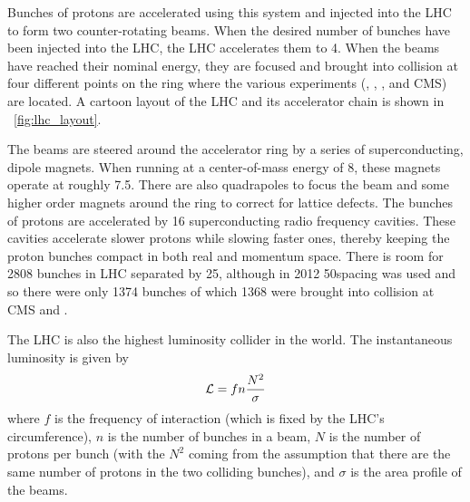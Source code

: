 Bunches of protons are accelerated using this system and injected into the LHC
to form two counter-rotating beams. When the desired number of bunches have
been injected into the LHC, the LHC accelerates them to 4\TeV. When the beams
have reached their nominal energy, they are focused and brought into collision
at four different points on the ring where the various experiments (\ALICE,
\ATLAS, \LHCB, and CMS) are located. A cartoon layout of the LHC and its
accelerator chain is shown in \FIG~\ref{fig:lhc_layout}.

The beams are steered around the accelerator ring by a series of
superconducting, dipole magnets. When running at a center-of-mass energy of
8\TeV, these magnets operate at roughly 7.5\Tesla. There are also quadrapoles
to focus the beam and some higher order magnets around the ring to correct for
lattice defects. The bunches of protons are accelerated by 16 superconducting
radio frequency cavities. These cavities accelerate slower protons while
slowing faster ones, thereby keeping the proton bunches compact in both real
and momentum space. There is room for 2808 bunches in LHC separated by 25\ns,
although in 2012 50\ns spacing was used and so there were only 1374 bunches of
which 1368 were brought into collision at CMS and \ATLAS.

The LHC is also the highest luminosity collider in the world. The instantaneous
luminosity is given by
\begin{equation}
    \mathcal{L} = f n \frac{N^{2}}{\sigma}
\end{equation}
where $f$ is the frequency of interaction (which is fixed by the LHC's
circumference), $n$ is the number of bunches in a beam, $N$ is the number of
protons per bunch (with the $N^{2}$ coming from the assumption that there are
the same number of protons in the two colliding bunches), and $\sigma$ is the
area profile of the beams.

